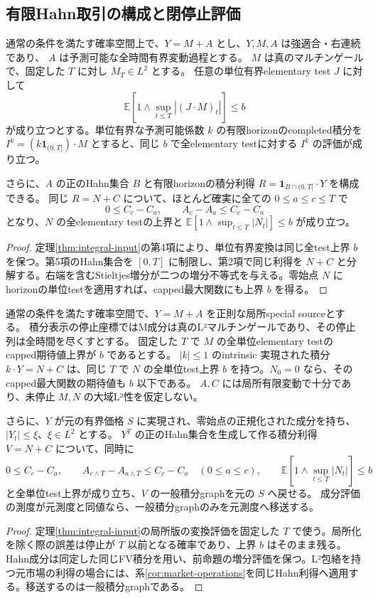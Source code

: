 \subsection{有限Hahn取引の構成と閉停止評価}
\label{sec:finite-hahn-proof}
\begin{proposition}[単位有界completed変換と有限horizonのHahn利得]
通常の条件を満たす確率空間上で、$Y=M+A$ とし、$Y,M,A$ は強適合・右連続であり、
$A$ は予測可能な全時間有界変動過程とする。
$M$ は真のマルチンゲールで、固定した $T$ に対し $M_T\in L^2$ とする。
任意の単位有界elementary test $J$ に対して
\[
 \mathbb E\left[1\wedge\sup_{t\leq T}|(J\cdot M)_t|\right]\leq b
\]
が成り立つとする。単位有界な予測可能係数 $k$ の有限horizonのcompleted積分を
$I^k=(k\mathbf 1_{(0,T]})\cdot M$ とすると、同じ $b$ で全elementary testに対する
$I^k$ の評価が成り立つ。

さらに、$A$ の正のHahn集合 $B$ と有限horizonの積分利得
$R=\mathbf 1_{B\cap(0,T]}\cdot Y$ を構成できる。
同じ $R=N+C$ について、ほとんど確実に全ての $0\leq a\leq c\leq T$ で
\[
 0\leq C_c-C_a,\qquad A_c-A_a\leq C_c-C_a
\]
となり、$N$ の全elementary testの上界と
$\mathbb E[1\wedge\sup_{t\leq T}|N_t|]\leq b$ が成り立つ。
\end{proposition}
\begin{proof}
定理\ref{thm:integral-input}の第4項により、単位有界変換は同じ全test上界 $b$ を保つ。第5項のHahn集合を $[0,T]$ に制限し、第2項で同じ利得を $N+C$ と分解する。右端を含むStieltjes増分が二つの増分不等式を与える。零始点 $N$ にhorizonの単位testを適用すれば、capped最大関数にも上界 $b$ を得る。
\end{proof}

\begin{proposition}[局所積分の変換への評価移送と元価格への帰還]
通常の条件を満たす確率空間で、$Y=M+A$ を正則な局所special sourceとする。
積分表示の停止座標ではM成分は真のL²マルチンゲールであり、その停止列は全時間を尽くすとする。
固定した $T$ で $M$ の全単位elementary testのcapped期待値上界が $b$ であるとする。
$|k|\leq1$ のintrinsic 実現された積分 $k\cdot Y=N+C$ は、同じ $T$ で
$N$ の全単位test上界 $b$ を持つ。$N_0=0$ なら、そのcapped最大関数の期待値も $b$ 以下である。
$A,C$ には局所有限変動で十分であり、未停止 $M,N$ の大域L²性を仮定しない。

さらに、$Y$ が元の有界価格 $S$ に実現され、零始点の正規化された成分を持ち、
$|Y_t|\leq\xi$、$\xi\in L^2$ とする。
$Y^T$ の正のHahn集合を生成して作る積分利得 $V=N+C$ について、同時に
\[
 0\leq C_c-C_a,\qquad A_{c\wedge T}-A_{a\wedge T}\leq C_c-C_a
 \quad(0\leq a\leq c),
 \qquad
 \mathbb E[1\wedge\sup_{t\leq T}|N_t|]\leq b
\]
と全単位test上界が成り立ち、$V$ の一般積分graphを元の $S$ へ戻せる。
成分評価の測度が元測度と同値なら、一般積分graphのみを元測度へ移送する。
\end{proposition}
\begin{proof}
定理\ref{thm:integral-input}の局所版の変換評価を固定した $T$ で使う。局所化を除く際の誤差は停止が $T$ 以前となる確率であり、上界 $b$ はそのまま残る。Hahn成分は同定した同じFV積分を用い、前命題の増分評価を保つ。L²包絡を持つ元市場の利得の場合には、系\ref{cor:market-operations}を同じHahn利得へ適用する。移送するのは一般積分graphである。
\end{proof}

